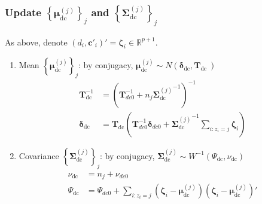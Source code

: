 \documentclass[]{article}
\begin{document}
\subsubsection{Update \(\left\{ \mathbf{\mu}_{\text{dc}}^{(j)} \right\}_{j}\) and \(\left\{ \mathbf{\Sigma}_{\text{dc}}^{(j)} \right\}_{j}\)}
As above, denote \(\left( d_{i},\mathbf{c}'_{i} \right)' = \bm{\zeta}_{i} \in \mathbb{R}^{p + 1}\).
\begin{enumerate}
	\def\labelenumi{(\arabic{enumi})}
	\item
	Mean \(\left\{ \bm{\mu}_{\text{dc}}^{(j)} \right\}_{j}\): by
	conjugacy, \(\bm{\mu}_{\text{dc}}^{(j)} \sim N\left( \bm{\delta}_{\text{dc}},\mathbf{T}_{\text{dc}}\  \right)\)
	\begin{align*}
		\mathbf{T}_{\text{dc}}^{- 1} &= \left( \mathbf{T}_{dc0}^{- 1} + n_{j}{\mathbf{\Sigma}_{\text{dc}}^{(j)}}^{- 1} \right)^{- 1}\\
		\bm{\delta}_{\text{dc}} &= \mathbf{T}_{\text{dc}}\left( \mathbf{T}_{dc0}^{- 1}\bm{\delta}_{dc0} + {\mathbf{\Sigma}_{\text{dc}}^{(j)}}^{- 1}\sum_{i:z_{i} = j}^{}\bm{\zeta}_{i} \right)
	\end{align*}
	\item
	Covariance \(\left\{ \mathbf{\Sigma}_{\text{dc}}^{(j)} \right\}_{j}\): by conjugacy, \(\mathbf{\Sigma}_{\text{dc}}^{(j)} \sim W^{- 1}\left( \Psi_{\text{dc}},\nu_{\text{dc}} \right)\)
	\begin{align*}
		\nu_{\text{dc}} &= n_{j} + \nu_{dc0}\\
		\Psi_{\text{dc}} &= \Psi_{dc0} + \sum_{i:z_{i} = j}^{}{\left( \bm{\zeta}_{i} - \bm{\mu}_{\text{dc}}^{(j)} \right)\left( \bm{\zeta}_{i} - \bm{\mu}_{\text{dc}}^{(j)} \right)'}
	\end{align*}
\end{enumerate}
\end{document}
